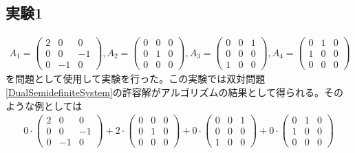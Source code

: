 \subsection{実験1}
\begin{align*}
  A_1 = \left(
            \begin{array}{ccc}
              2 &  0 &  0 \\
              0 &  0 & -1 \\
              0 & -1 &  0
            \end{array}
          \right),
  A_2 = \left(
            \begin{array}{ccc}
              0 & 0 & 0 \\
              0 & 1 & 0 \\
              0 & 0 & 0
            \end{array}
          \right),
  A_3 = \left(
            \begin{array}{ccc}
              0 & 0 & 1 \\
              0 & 0 & 0 \\
              1 & 0 & 0
            \end{array}
          \right),
  A_4 = \left(
            \begin{array}{ccc}
              0 & 1 & 0 \\
              1 & 0 & 0 \\
              0 & 0 & 0
            \end{array}
          \right)
\end{align*}
を問題として使用して実験を行った。この実験では双対問題\ref{DualSemidefiniteSystem}の許容解がアルゴリズムの結果として得られる。そのような例としては
\begin{align*}
    0 \cdot \left(
              \begin{array}{ccc}
                2 &  0 &  0 \\
                0 &  0 & -1 \\
                0 & -1 &  0
              \end{array}
            \right)
  + 2 \cdot \left(
              \begin{array}{ccc}
                0 & 0 & 0 \\
                0 & 1 & 0 \\
                0 & 0 & 0
              \end{array}
            \right)
  + 0 \cdot \left(
              \begin{array}{ccc}
                0 & 0 & 1 \\
                0 & 0 & 0 \\
                1 & 0 & 0
              \end{array}
            \right)
  + 0 \cdot \left(
              \begin{array}{ccc}
                0 & 1 & 0 \\
                1 & 0 & 0 \\
                0 & 0 & 0
              \end{array}
            \right)
\end{align*}

